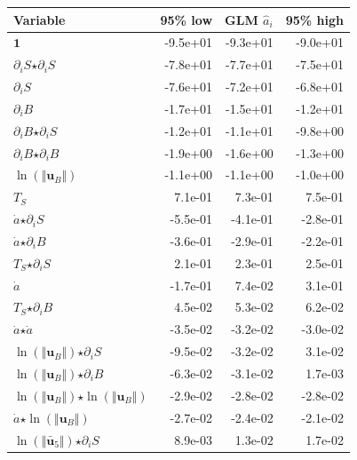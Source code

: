 \begin{table}[H]
\centering
\begin{tabular}{l|r|r|r}
  \textbf{Variable} & \textbf{95\% low} & \textbf{GLM} $\hat{a}_i$ & \textbf{95\% high} \\
  \hline
  $\mathbf{1}$ & -9.5e+01 & -9.3e+01 & -9.0e+01 \\
  $\partial_i S$$ \star $$\partial_i S$ & -7.8e+01 & -7.7e+01 & -7.5e+01 \\
  $\partial_i S$ & -7.6e+01 & -7.2e+01 & -6.8e+01 \\
  $\partial_i B$ & -1.7e+01 & -1.5e+01 & -1.2e+01 \\
  $\partial_i B$$ \star $$\partial_i S$ & -1.2e+01 & -1.1e+01 & -9.8e+00 \\
  $\partial_i B$$ \star $$\partial_i B$ & -1.9e+00 & -1.6e+00 & -1.3e+00 \\
  $\ln\left( \Vert \mathbf{u}_B \Vert \right)$ & -1.1e+00 & -1.1e+00 & -1.0e+00 \\
  $T_S$ & 7.1e-01 & 7.3e-01 & 7.5e-01 \\
  $\dot{a}$$ \star $$\partial_i S$ & -5.5e-01 & -4.1e-01 & -2.8e-01 \\
  $\dot{a}$$ \star $$\partial_i B$ & -3.6e-01 & -2.9e-01 & -2.2e-01 \\
  $T_S$$ \star $$\partial_i S$ & 2.1e-01 & 2.3e-01 & 2.5e-01 \\
  \color{red}$\dot{a}$ & \color{red}-1.7e-01 & \color{red}7.4e-02 & \color{red}3.1e-01 \\
  $T_S$$ \star $$\partial_i B$ & 4.5e-02 & 5.3e-02 & 6.2e-02 \\
  $\dot{a}$$ \star $$\dot{a}$ & -3.5e-02 & -3.2e-02 & -3.0e-02 \\
  \color{red}$\ln\left( \Vert \mathbf{u}_B \Vert \right)$$ \star $$\partial_i S$ & \color{red}-9.5e-02 & \color{red}-3.2e-02 & \color{red}3.1e-02 \\
  \color{red}$\ln\left( \Vert \mathbf{u}_B \Vert \right)$$ \star $$\partial_i B$ & \color{red}-6.3e-02 & \color{red}-3.1e-02 & \color{red}1.7e-03 \\
  $\ln\left( \Vert \mathbf{u}_B \Vert \right)$$ \star $$\ln\left( \Vert \mathbf{u}_B \Vert \right)$ & -2.9e-02 & -2.8e-02 & -2.8e-02 \\
  $\dot{a}$$ \star $$\ln\left( \Vert \mathbf{u}_B \Vert \right)$ & -2.7e-02 & -2.4e-02 & -2.1e-02 \\
  $\ln\left( \Vert \bar{\mathbf{u}}_{5} \Vert \right)$$ \star $$\partial_i S$ & 8.9e-03 & 1.3e-02 & 1.7e-02 \\

\end{tabular}
\end{table}
